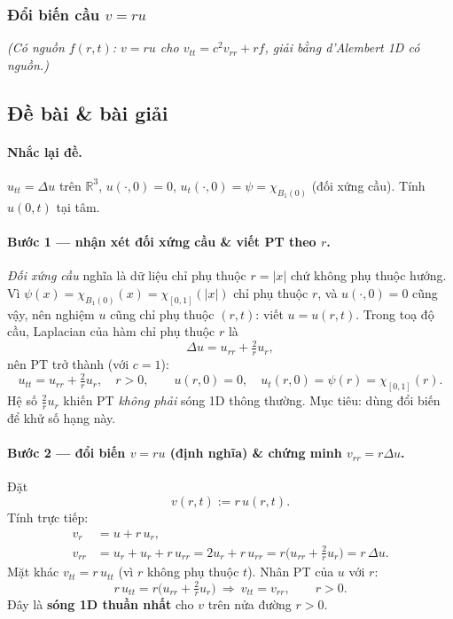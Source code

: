 \subsubsection*{Đổi biến cầu $v=ru$}

\emph{(Có nguồn $f(r,t)$: $v=ru$ cho $v_{tt}=c^2v_{rr}+rf$, giải bằng d'Alembert 1D có nguồn.)}

\subsection*{Đề bài \& bài giải}
\paragraph{Nhắc lại đề.} $u_{tt}=\Delta u$ trên $\mathbb{R}^3$, $u(\cdot,0)=0$, $u_t(\cdot,0)=\psi=\chi_{B_1(0)}$
(đối xứng cầu). Tính $u(0,t)$ tại tâm.

\paragraph{Bước 1 --- nhận xét đối xứng cầu \& viết PT theo $r$.}\leavevmode

\emph{Đối xứng cầu} nghĩa là dữ liệu chỉ phụ thuộc $r=|x|$ chứ không phụ thuộc hướng. Vì $\psi(x)=\chi_{B_1(0)}(x)=\chi_{[0,1]}(|x|)$ chỉ phụ thuộc $r$, và $u(\cdot,0)=0$ cũng vậy, nên nghiệm $u$ cũng chỉ phụ thuộc $(r,t)$: viết $u=u(r,t)$. Trong toạ độ cầu, Laplacian của hàm chỉ phụ thuộc $r$ là
\[
  \Delta u=u_{rr}+\tfrac{2}{r}u_r,
\]
nên PT trở thành (với $c=1$):
\[
  u_{tt}=u_{rr}+\tfrac{2}{r}u_r,\quad r>0,\qquad u(r,0)=0,\quad u_t(r,0)=\psi(r)=\chi_{[0,1]}(r).
\]
Hệ số $\tfrac{2}{r}u_r$ khiến PT \emph{không phải} sóng 1D thông thường. Mục tiêu: dùng đổi biến để khử số hạng này.

\paragraph{Bước 2 --- đổi biến $v=ru$ (định nghĩa) \& chứng minh $v_{rr}=r\Delta u$.}\leavevmode

Đặt
\[
  v(r,t):=r\,u(r,t).
\]
Tính trực tiếp:
\begin{align*}
  v_r &= u+r\,u_r,\\
  v_{rr} &= u_r+u_r+r\,u_{rr}=2u_r+r\,u_{rr}=r\Big(u_{rr}+\tfrac{2}{r}u_r\Big)=r\,\Delta u.
\end{align*}
Mặt khác $v_{tt}=r\,u_{tt}$ (vì $r$ không phụ thuộc $t$). Nhân PT của $u$ với $r$:
\[
  r\,u_{tt}=r\Big(u_{rr}+\tfrac{2}{r}u_r\Big)\ \Longrightarrow\ v_{tt}=v_{rr},\qquad r>0.
\]
Đây là \textbf{sóng 1D thuần nhất} cho $v$ trên nửa đường $r>0$.


